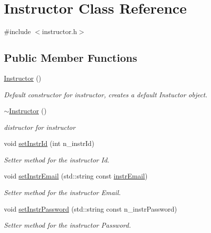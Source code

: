 \hypertarget{class_instructor}{}\section{Instructor Class Reference}
\label{class_instructor}


{\ttfamily \#include $<$instructor.\+h$>$}

\subsection*{Public Member Functions}
\begin{DoxyCompactItemize}
\item 
\hyperlink{class_instructor_a7e4414cdb058703970bbcecf3a97046e}{Instructor} ()
\begin{DoxyCompactList}\small\item\em Default constructor for instructor, creates a default Instuctor object. \end{DoxyCompactList}\item 
\hyperlink{class_instructor_aa204bec2066fabdd81a065999b01816c}{$\sim$\+Instructor} ()
\begin{DoxyCompactList}\small\item\em distructor for instructor \end{DoxyCompactList}\item 
void \hyperlink{class_instructor_a91ec2cfd9d228fbed7a6019f4e81eb5c}{set\+Instr\+Id} (int n\+\_\+instr\+Id)
\begin{DoxyCompactList}\small\item\em Setter method for the instructor Id. \end{DoxyCompactList}\item 
void \hyperlink{class_instructor_a99b99002bf23dba78dc65043c7d87c5d}{set\+Instr\+Email} (std\+::string const \hyperlink{class_instructor_aa32f70770889ea70fd9e37b176b3d35a}{instr\+Email})
\begin{DoxyCompactList}\small\item\em Setter method for the instructor Email. \end{DoxyCompactList}\item 
void \hyperlink{class_instructor_aaa6d77244009f29a2e5e1acc3d18220c}{set\+Instr\+Password} (std\+::string const n\+\_\+instr\+Password)
\begin{DoxyCompactList}\small\item\em Setter method for the instructor Password. \end{DoxyCompactList}\item 

\end{DoxyCompactItemize}
